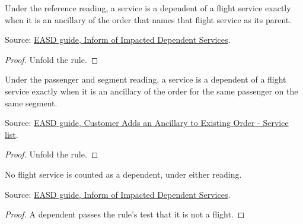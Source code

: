 \begin{theorem}
  \label{thm:ancillaries-dependents-by-reference}
  Under the reference reading, a service is a dependent of a flight service
  exactly when it is an ancillary of the order that names that flight
  service as its parent.

  Source: \href{https://standards.atlassian.net/wiki/spaces/EASD/pages/672825400}{EASD guide, Inform of Impacted Dependent Services}.
\end{theorem}
\begin{proof}
  Unfold the rule.
\end{proof}

\begin{theorem}
  \label{thm:ancillaries-dependents-by-passenger-segment}
  Under the passenger and segment reading, a service is a dependent of a
  flight service exactly when it is an ancillary of the order for the same
  passenger on the same segment.

  Source: \href{https://standards.atlassian.net/wiki/spaces/EASD/pages/842301531}{EASD guide, Customer Adds an Ancillary to Existing Order - Service list}.
\end{theorem}
\begin{proof}
  Unfold the rule.
\end{proof}

\begin{theorem}
  \label{thm:ancillaries-dependent-not-flight}
  No flight service is counted as a dependent, under either reading.

  Source: \href{https://standards.atlassian.net/wiki/spaces/EASD/pages/672825400}{EASD guide, Inform of Impacted Dependent Services}.
\end{theorem}
\begin{proof}
  A dependent passes the rule's test that it is not a flight.
\end{proof}

